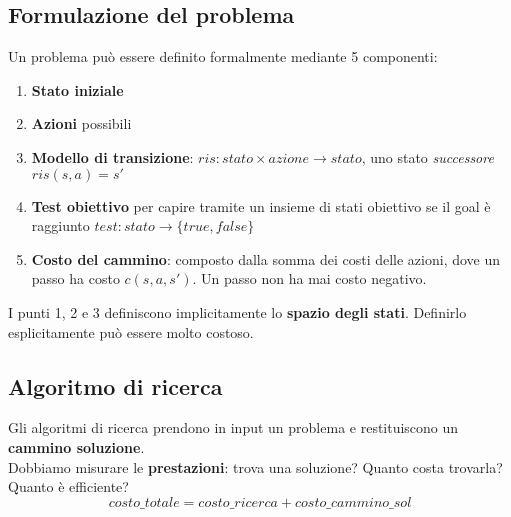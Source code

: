 \subsection{Formulazione del problema}
Un problema può essere definito formalmente mediante 5 componenti:
\begin{enumerate}
	\item \textbf{Stato iniziale}
	\item \textbf{Azioni} possibili
	\item \textbf{Modello di transizione}: $ris: stato \times azione \to stato$, uno stato \emph{successore} $ris(s,a)=s'$
	\item \textbf{Test obiettivo} per capire tramite un insieme di stati obiettivo se il goal è raggiunto $test: stato \to \{true,false\}$
	\item \textbf{Costo del cammino}: composto dalla somma dei costi delle azioni, dove un passo ha costo $c(s,a,s')$. Un passo non ha mai costo negativo.
\end{enumerate}
I punti 1, 2 e 3 definiscono implicitamente lo \textbf{spazio degli stati}. Definirlo esplicitamente può essere molto costoso.

\subsection{Algoritmo di ricerca}
Gli algoritmi di ricerca prendono in input un problema e restituiscono un \textbf{cammino soluzione}.\\
Dobbiamo misurare le \textbf{prestazioni}: trova una soluzione? Quanto costa trovarla? Quanto è efficiente?
\begin{equation*}
	costo\_totale=costo\_ricerca+costo\_cammino\_sol
\end{equation*}

